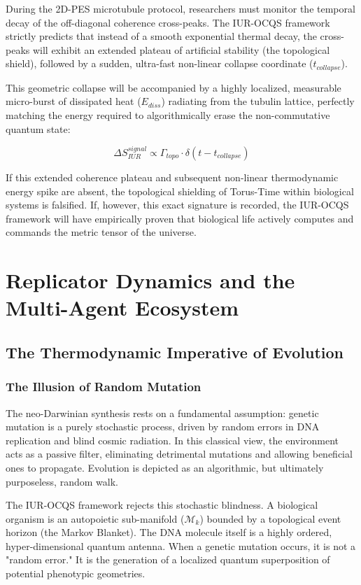 \documentclass[12pt,openany]{book}
\begin{document}
During the 2D-PES microtubule protocol, researchers must monitor the temporal decay of the off-diagonal coherence cross-peaks. The IUR-OCQS framework strictly predicts that instead of a smooth exponential thermal decay, the cross-peaks will exhibit an extended plateau of artificial stability (the topological shield), followed by a sudden, ultra-fast non-linear collapse coordinate ($t_{collapse}$). 

This geometric collapse will be accompanied by a highly localized, measurable micro-burst of dissipated heat ($E_{diss}$) radiating from the tubulin lattice, perfectly matching the energy required to algorithmically erase the non-commutative quantum state:

\begin{equation}
\Delta S_{IUR}^{signal} \propto \Gamma_{topo} \cdot \delta(t - t_{collapse})
\end{equation}

If this extended coherence plateau and subsequent non-linear thermodynamic energy spike are absent, the topological shielding of Torus-Time within biological systems is falsified. If, however, this exact signature is recorded, the IUR-OCQS framework will have empirically proven that biological life actively computes and commands the metric tensor of the universe.

\part{Replicator Dynamics and the Multi-Agent Ecosystem}

\chapter{The Thermodynamic Imperative of Evolution}

\section{The Illusion of Random Mutation}
The neo-Darwinian synthesis rests on a fundamental assumption: genetic mutation is a purely stochastic process, driven by random errors in DNA replication and blind cosmic radiation. In this classical view, the environment acts as a passive filter, eliminating detrimental mutations and allowing beneficial ones to propagate. Evolution is depicted as an algorithmic, but ultimately purposeless, random walk.

The IUR-OCQS framework rejects this stochastic blindness. A biological organism is an autopoietic sub-manifold ($\mathcal{M}_k$) bounded by a topological event horizon (the Markov Blanket). The DNA molecule itself is a highly ordered, hyper-dimensional quantum antenna. When a genetic mutation occurs, it is not a "random error." It is the generation of a localized quantum superposition of potential phenotypic geometries. 
\end{document}
